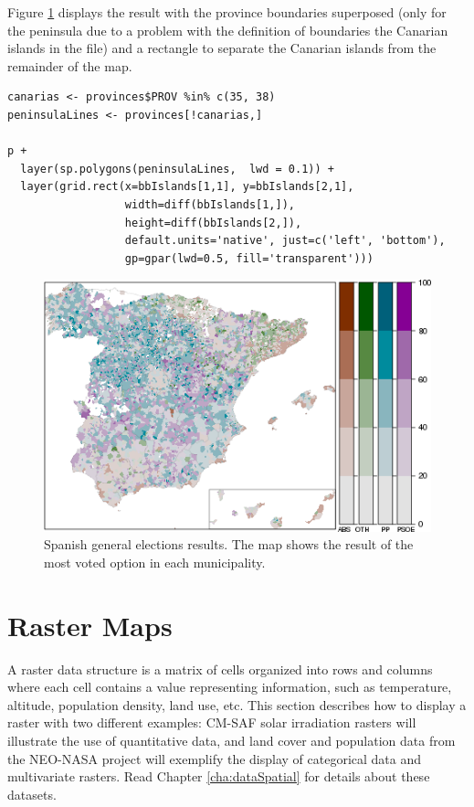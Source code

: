 \documentclass[smallroyalvopaper]{memoir}
\begin{document}
Figure \ref{fig:mapLegends} displays the result with the province boundaries
superposed (only for the peninsula due to a problem with the
definition of boundaries the Canarian islands in the file) and a
rectangle to separate the Canarian islands from the remainder of the
map.

\lstset{language=R,numbers=none}
\begin{lstlisting}
canarias <- provinces$PROV %in% c(35, 38)
peninsulaLines <- provinces[!canarias,]

p +
  layer(sp.polygons(peninsulaLines,  lwd = 0.1)) +
  layer(grid.rect(x=bbIslands[1,1], y=bbIslands[2,1],
                  width=diff(bbIslands[1,]),
                  height=diff(bbIslands[2,]),
                  default.units='native', just=c('left', 'bottom'),
                  gp=gpar(lwd=0.5, fill='transparent')))
\end{lstlisting}

\begin{figure}[htb]
\centering
\includegraphics[width=.9\linewidth]{figs/mapLegends.png}
\caption{\label{fig:mapLegends}Spanish general elections results. The map shows the result of the most voted option in each municipality.}
\end{figure}
\section{Raster Maps}
\label{sec-1}
\label{cha:raster}

A raster data structure is a matrix of cells organized into rows and
columns where each cell contains a value representing information,
such as temperature, altitude, population density, land use, etc.
This section describes how to display a raster with two different
examples: CM-SAF solar irradiation rasters will illustrate the use of
quantitative data, and land cover and population data from the
NEO-NASA project will exemplify the display of categorical data and
multivariate rasters. Read Chapter \ref{cha:dataSpatial} for
details about these datasets.
\end{document}

